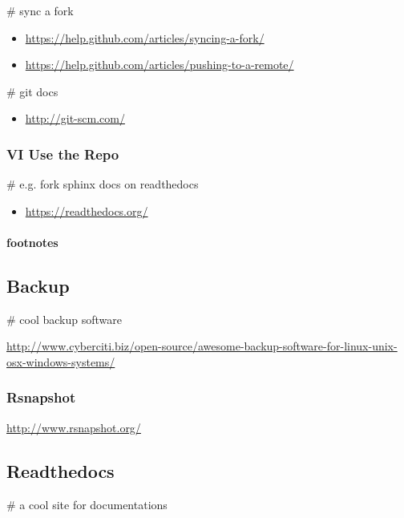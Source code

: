 \documentclass[letterpaper,10pt,english]{sphinxmanual}
\begin{document}
\# sync a fork
\begin{itemize}
\item {} 
\href{https://help.github.com/articles/syncing-a-fork/}{https://help.github.com/articles/syncing-a-fork/}

\item {} 
\href{https://help.github.com/articles/pushing-to-a-remote/}{https://help.github.com/articles/pushing-to-a-remote/}

\end{itemize}

\# git docs
\begin{itemize}
\item {} 
\href{http://git-scm.com/}{http://git-scm.com/}

\end{itemize}


\subsubsection{VI Use the Repo}
\label{sdocs/github/github:vi-use-the-repo}
\# e.g. fork sphinx docs on readthedocs
\begin{itemize}
\item {} 
\href{https://readthedocs.org/}{https://readthedocs.org/}

\end{itemize}
\paragraph{footnotes}


\subsection{Backup}
\label{sdocs/backup/backup:backup}\label{sdocs/backup/backup::doc}
\# cool backup software

\href{http://www.cyberciti.biz/open-source/awesome-backup-software-for-linux-unix-osx-windows-systems/}{http://www.cyberciti.biz/open-source/awesome-backup-software-for-linux-unix-osx-windows-systems/}


\subsubsection{Rsnapshot}
\label{sdocs/backup/rsnapshot/rsnapshot::doc}\label{sdocs/backup/rsnapshot/rsnapshot:rsnapshot}
\href{http://www.rsnapshot.org/}{http://www.rsnapshot.org/}


\subsection{Readthedocs}
\label{sdocs/readthedocs/readthedocs:readthedocs}\label{sdocs/readthedocs/readthedocs::doc}
\# a cool site for documentations
\end{document}
